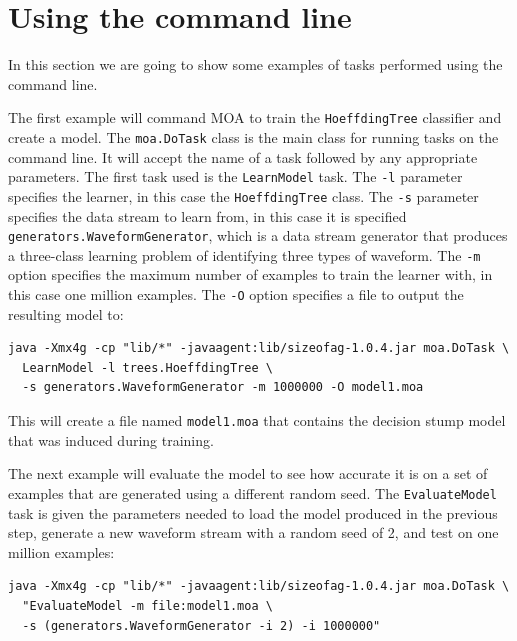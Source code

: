 \documentclass[a4paper,12pt,twoside]{book}
\begin{document}
\section{Using the command line}

In this section we are going to show some examples of tasks performed using the command line.

The first example will command MOA to train the \verb+HoeffdingTree+ classifier and create a model. The \verb+moa.DoTask+ class is the main class for running tasks on the command line. It will accept the name of a task followed by any appropriate parameters. The first task used is the \verb+LearnModel+ task. The \verb+-l+ parameter specifies the learner, in this case the \verb+HoeffdingTree+ class. The \verb+-s+ parameter specifies the data stream to learn from, in this case it is
specified  \verb+generators.WaveformGenerator+, which is a data stream generator that produces a three-class learning problem of identifying three types of waveform. The \verb+-m+ option specifies the maximum number of examples to train the learner with, in this case one million examples. The \verb+-O+ option specifies a file to output the resulting model to:

\begin{footnotesize}\begin{verbatim}
java -Xmx4g -cp "lib/*" -javaagent:lib/sizeofag-1.0.4.jar moa.DoTask \
  LearnModel -l trees.HoeffdingTree \
  -s generators.WaveformGenerator -m 1000000 -O model1.moa
\end{verbatim}\end{footnotesize}

This will create a file named \verb+model1.moa+ that contains the decision stump model that was induced during training.

The next example will evaluate the model to see how accurate it is on a set of examples that are generated using a different random seed. The \verb+EvaluateModel+ task is given the parameters needed to load the model produced in the previous step, generate a new waveform stream with a random seed of 2, and test on one million examples:

\begin{footnotesize}\begin{verbatim}
java -Xmx4g -cp "lib/*" -javaagent:lib/sizeofag-1.0.4.jar moa.DoTask \
  "EvaluateModel -m file:model1.moa \
  -s (generators.WaveformGenerator -i 2) -i 1000000"
\end{verbatim}\end{footnotesize}
\end{document}

